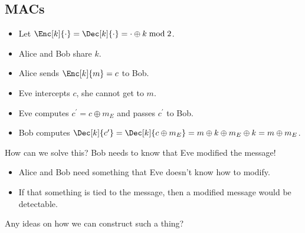 \subsection{\Aclp{MAC}}

\begin{frame}
  \begin{example}
    \begin{itemize}
      \item Let \(\Enc[k]{\cdot} = \Dec[k]{\cdot} = \cdot\oplus k\bmod 2\).
        
        \pause{}

      \item Alice and Bob share \(k\).
      \item Alice sends \(\Enc[k]{m} = c\) to Bob.

        \pause{}

      \item Eve intercepts \(c\), she cannot get to \(m\).

        \pause{}

      \item Eve computes \(c^\prime = c\oplus m_E\) and passes \(c^\prime\) to 
        Bob.

        \pause{}

      \item Bob computes \(\Dec[k]{c^\prime} = \Dec[k]{c\oplus m_E} = m\oplus 
          k\oplus m_E\oplus k = m\oplus m_E\).
    \end{itemize}
  \end{example}

  \pause{}
  
  \begin{exercise}
    How can we solve this?
    Bob needs to know that Eve modified the message!
  \end{exercise}
\end{frame}

\begin{frame}
  \begin{idea}
    \begin{itemize}
      \item Alice and Bob need something that Eve doesn't know how to modify.

        \pause{}

      \item If that something is tied to the message, then a modified message 
        would be detectable.
    \end{itemize}
  \end{idea}

  \pause{}

  \begin{exercise}
    Any ideas on how we can construct such a thing?
  \end{exercise}
\end{frame}

